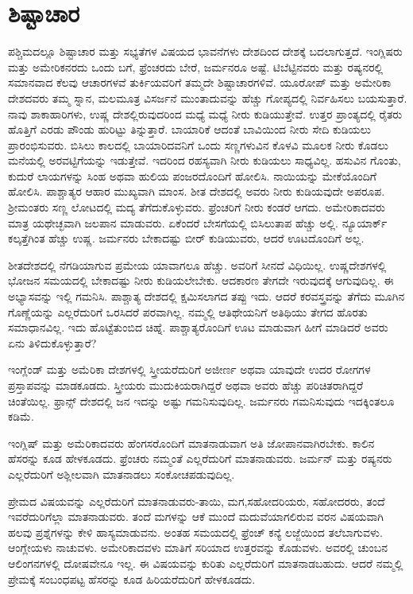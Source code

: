 \newpage

\section*{ಶಿಷ್ಟಾಚಾರ}

ಪಶ್ಚಿಮದಲ್ಲೂ ಶಿಷ್ಟಾಚಾರ ಮತ್ತು ಸಭ್ಯತೆಗಳ ವಿಷಯದ ಭಾವನೆಗಳು ದೇಶದಿಂದ ದೇಶಕ್ಕೆ ಬದಲಾಗುತ್ತದೆ. ಇಂಗ್ಲಿಷರು ಮತ್ತು ಅಮೇರಿಕನರದು ಒಂದು ಬಗೆ, ಫ್ರೆಂಚರದು ಬೇರೆ, ಜರ್ಮನರೂ ಅಷ್ಟೆ. ಟಿಬೆಟ್ಟಿನವರು ಮತ್ತು ರಷ್ಯನರಲ್ಲಿ ಸಮಾನವಾದ ಕೆಲವು ಆಚಾರಗಳವೆ ತುರ್ಕಿಯವರಿಗೆ ತಮ್ಮದೇ ಶಿಷ್ಟಾಚಾರಗಳಿವೆ. ಯೂರೋಪ್​ ಮತ್ತು ಅಮೇರಿಕಾ ದೇಶದವರು ತಮ್ಮ ಸ್ನಾನ, ಮಲಮೂತ್ರ ವಿಸರ್ಜನೆ ಮುಂತಾದುವನ್ನು ಹೆಚ್ಚು ಗೋಪ್ಯದಲ್ಲಿ ನಿರ್ವಹಿಸಲು ಬಯಸುತ್ತಾರೆ. ನಾವು ಶಾಕಾಹಾರಿಗಳು, ಉಷ್ಣ ದೇಶಲ್ಲಿರುವುದರಿಂದ ಮಧ್ಯೆ ಮಧ್ಯೆ ನೀರು ಕುಡಿಯುತ್ತೇವೆ. ಉತ್ತರ ಪ್ರಾಂತ್ಯದಲ್ಲಿ ರೈತರು ಹೊತ್ತಿಗೆ ಎರಡು ಪೌಂಡು ಹುರಿಟ್ಟು ತಿನ್ನುತ್ತಾರೆ. ಬಾಯಾರಿಕೆ ಆದಂತೆ ಬಾವಿಯಿಂದ ನೀರು ಸೇದಿ ಕುಡಿಯಲು ಪ್ರಾರಂಭಿಸುವರು. ಬಿಸಿಲು ಕಾಲದಲ್ಲಿ ಬಾಯಾರಿದವನಿಗೆ ಒಂದು ಸಣ್ಣಗಳುವಿನ ಕೊಳವಿ ಮೂಲಕ ನೀರು ಕೊಡಲು ಮನೆಯಲ್ಲಿ ಅರವಟ್ಟಿಗೆಯನ್ನು ಇಡುತ್ತೇವೆ. ಇದರಿಂದ ರಹಸ್ಯವಾಗಿ ನೀರು ಕುಡಿಯಲು ಸಾಧ್ಯವಿಲ್ಲ. ಹಸುವಿನ ಗೊಂತು, ಕುದುರೆ ಲಾಯಗಳನ್ನು ಸಿಂಹ ಅಥವಾ ಹುಲಿಯ ಪಂಜರದೊಂದಿಗೆ ಹೋಲಿಸಿ. ನಾಯಿಯನ್ನು ಮೇಕೆಯೊಂದಿಗೆ ಹೋಲಿಸಿ. ಪಾಶ್ಚಾತ್ಯರ ಆಹಾರ ಮುಖ್ಯವಾಗಿ ಮಾಂಸ. ಶೀತ ದೇಶದಲ್ಲಿ ಅವರು ನೀರು ಕುಡಿಯವುದೇ ಅಪರೂಪ. ಶ‍್ರೀಮಂತರು ಸಣ್ಣ ಲೋಟದಲ್ಲಿ ಮದ್ಯ ತೆಗೆದುಕೊಳ್ಳುವರು. ಫ್ರೆಂಚರಿಗೆ ನೀರು ಕಂಡರೆ ಆಗದು. ಅಮೇರಿಕಾದವರು ಮಾತ್ರ ಯಥೇಚ್ಛವಾಗಿ ಜಲಪಾನ ಮಾಡುವರು. ಏಕೆಂದರೆ ಬೇಸಗೆಯಲ್ಲಿ ಬಿಸಿಲುತಾಪ ಹೆಚ್ಚು ಅಲ್ಲಿ. ನ್ಯೂಯಾರ್ಕ್ ಕಲ್ಕತ್ತೆಗಿಂತ ಹೆಚ್ಚು ಉಷ್ಣ. ಜರ್ಮನರು ಬೇಕಾದಷ್ಟು ಬೀರ್​ ಕುಡಿಯುವರು, ಆದರೆ ಊಟದೊಂದಿಗೆ ಅಲ್ಲ.

ಶೀತದೇಶದಲ್ಲಿ ನೆಗಡಿಯಾಗುವ ಪ್ರಮೇಯ ಯಾವಾಗಲೂ ಹೆಚ್ಚು. ಅವರಿಗೆ ಸೀನದೆ ವಿಧಿಯಿಲ್ಲ. ಉಷ್ಣದೇಶಗಳಲ್ಲಿ ಭೋಜನ ಸಮಯದಲ್ಲಿ ಬೇಕಾದಷ್ಟು ನೀರು ಕುಡಿಯಲೇ\break ಬೇಕು. ಆದಕಾರಣ ತೇಗದೇ ಇರುವುದಕ್ಕೆ ಆಗುವುದಿಲ್ಲ. ಈ ಅಭ್ಯಾಸವನ್ನು ಇಲ್ಲಿ ಗಮನಿಸಿ. ಪಾಶ್ಚಾತ್ಯ ದೇಶದಲ್ಲಿ ಕ್ಷಮಿಸಲಾಗದ ತಪ್ಪು ಇದು. ಆದರೆ ಕರವಸ್ತ್ರವನ್ನು ತೆಗೆದು ಮೂಗಿನ ಗೊಣ್ಣೆಯನ್ನು ಎಲ್ಲರೆದುರಿಗೆ ಒರಸಿದರೆ ಪರವಾಗಿಲ್ಲ. ನಮ್ಮಲ್ಲಿ ಆತಿಥೇಯನಿಗೆ ಅತಿಥಿಯು ತೇಗದ ಹೊರತು ಸಮಾಧಾನವಿಲ್ಲ. ಇದು ಹೊಟ್ಟೆತುಂಬಿದ ಚಿಹ್ನೆ. ಪಾಶ್ಚಾತ್ಯರೊಂದಿಗೆ ಊಟ ಮಾಡುವಾಗ ಹೀಗೆ ಮಾಡಿದರೆ ಅವರು ಏನು ತಿಳಿದುಕೊಳ್ಳುತ್ತಾರೆ?

ಇಂಗ್ಲೆಂಡ್​ ಮತ್ತು ಅಮೆರಿಕಾ ದೇಶಗಳಲ್ಲಿ ಸ್ತ್ರೀಯರೆದುರಿಗೆ ಅಜೀರ್ಣ ಅಥವಾ ಯಾವುದೇ ಉದರ ರೋಗಗಳ ಪ್ರಸ್ತಾಪವನ್ನು ಮಾಡಕೂಡದು. ಸ್ತ್ರೀಯರು ಮುದುಕಿಯ\break ರಾಗಿದ್ದರೆ ಅಥವಾ ಅವರು ಹೆಚ್ಚು ಪರಿಚಿತರಾಗಿದ್ದರೆ ಚಿಂತೆಯಿಲ್ಲ. ಫ್ರಾನ್ಸ್​ ದೇಶದಲ್ಲಿ ಜನ ಇದನ್ನು ಅಷ್ಟು ಗಮನಿಸುವುದಿಲ್ಲ. ಜರ್ಮನರು ಗಮನಿಸುವುದು ಇದಕ್ಕಿಂತಲೂ ಕಡಿಮೆ.

ಇಂಗ್ಲಿಷ್​ ಮತ್ತು ಅಮೆರಿಕಾದವರು ಹೆಂಗಸರೊಂದಿಗೆ ಮಾತನಾಡುವಾಗ ಅತಿ ಜೋಪಾನವಾಗಿರಬೇಕು. ಕಾಲಿನ ಹೆಸರನ್ನು ಕೂಡ ಹೇಳಕೂಡದು. ಫ್ರೆಂಚರು ನಮ್ಮಂತೆ ಎಲ್ಲರೆದುರಿಗೆ ಮಾತನಾಡುವರು. ಜರ್ಮನ್​ ಮತ್ತು ರಷ್ಯನರು ಎಲ್ಲರೆದುರಿಗೆ ಅಶ್ಲೀಲವಾಗಿ ಮಾತನಾಡಲು ಸಂಕೋಚಪಡುವುದಿಲ್ಲ.

ಪ್ರೇಮದ ವಿಷಯವನ್ನು ಎಲ್ಲರೆದುರಿಗೆ ಮಾತನಾಡುವರು-ತಾಯಿ, ಮಗ,\break ಸಹೋದರಿಯರು, ಸಹೋದರರು, ತಂದೆ ಇವರೆದುರಿಗೆಲ್ಲಾ ಮಾತನಾಡುವರು. ತಂದೆ ಮಗಳನ್ನು ಆಕೆ ಮುಂದೆ ಮದುವೆಯಾಗಲಿರುವ ವರನ ವಿಷಯವಾಗಿ ಹಲವು ಪ್ರಶ್ನೆಗಳನ್ನು ಕೇಳಿ ಹಾಸ್ಯಮಾಡುವನು. ಅಂತಹ ಸಮಯದಲ್ಲಿ ಫ್ರೆಂಚ್​ ಕನ್ಯೆ ಲಜ್ಜೆಯಿಂದ ತಲೆಬಾಗುವಳು. ಆಂಗ್ಲೇಯಳು ನಾಚುವಳು. ಅಮೇರಿಕಾದವಳು ಮಾತಿಗೆ ಸರಿಯಾದ ಉತ್ತರವನ್ನು ಕೊಡುವಳು. ಅವರಲ್ಲಿ ಚುಂಬನ ಆಲಿಂಗನಗಳಲ್ಲಿ ದೋಷವೇನೂ ಇಲ್ಲ. ಈ ವಿಷಯವನ್ನು ಕುರಿತು ಎಲ್ಲರೆದುರಿಗೆ ಮಾತನಾಡಬಹುದು. ಆದರೆ ನಮ್ಮಲ್ಲಿ ಪ್ರೇಮಕ್ಕೆ ಸಂಬಂಧಪಟ್ಟ ಹೆಸರನ್ನು ಕೂಡ ಹಿರಿಯರೆದುರಿಗೆ ಹೇಳಕೂಡದು.

